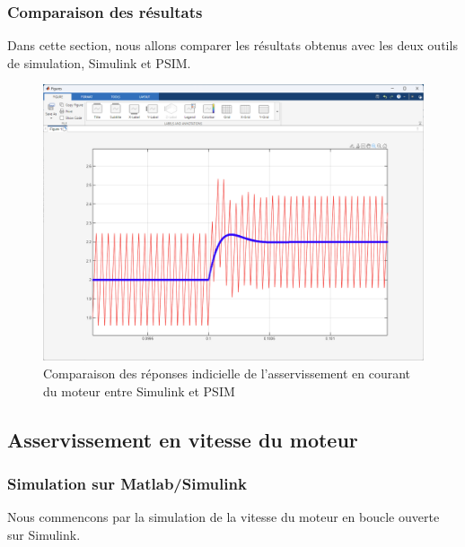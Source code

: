 \subsubsection{Comparaison des résultats}

Dans cette section, nous allons comparer les résultats obtenus avec les deux outils de simulation, Simulink et PSIM.

\begin{figure}[H]
    \centering
    \includegraphics[width=1\textwidth]{images/boucle_de_courant/comparaison_reponse_indicielle_courant.png}
    \caption{Comparaison des réponses indicielle de l'asservissement en courant du moteur entre Simulink et PSIM}
    \label{fig:comparaison_reponse_indicielle_courant}
\end{figure}

\subsection{Asservissement en vitesse du moteur}

\subsubsection{Simulation sur Matlab/Simulink}
Nous commencons par la simulation de la vitesse du moteur en boucle ouverte sur Simulink. 

